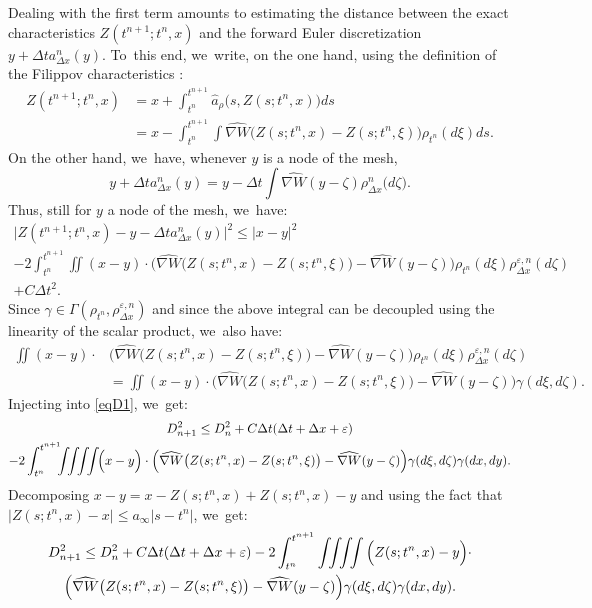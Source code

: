 \documentclass[JEP,XML,SOM,Unicode, NoFloatCountersInSection,published]{cedram}
\def\intquad {\int\mbox{\hspace{-2mm}}\int\mbox{\hspace{-2mm}}\int\mbox{\hspace{-2mm}}\int}
\def\eps{\varepsilon}
\def\dt{\Delta t}
\def\dx{\Delta x}
\def\achapo{\widehat{a}}
\def\nabWchapo{\widehat{\nabla W}}
\theoremstyle{plain}
\theoremstyle{definition}
\begin{document}
Dealing with the first term amounts to estimating the distance between the exact characteristics $Z(t^{n+1};t^n,x)$ and the forward Euler discretization $y+\dt a^n_{\dx}(y)$. To~this end, we~write, on the one hand, using the definition of the Filippov characteristics \cite{filippov88, poupaud_rascle97}:
\begin{align*}
Z(t^{n+1};t^n,x) & = x + \int_{t^n}^{t^{n+1}} \achapo_\rho\bigl(s,Z(s;t^n,x)\bigr) ds
\\
& = x - \int_{t^n}^{t^{n+1}} \int\nabWchapo\bigl(Z(s;t^n,x)-Z(s;t^n,\xi)\bigr) \rho_{t^n}(d\xi) ds.
\end{align*}
On the other hand, we~have, whenever $y$ is a node of the mesh,
\begin{equation*}
y + \dt a^n_{\dx}(y)
= y - \dt \int
\nabWchapo( y - \zeta) \rho^n_{\dx}( d \zeta \bigr).
\end{equation*}
Thus, still for $y$ a node of the mesh, we~have:
\begin{multline*}
\bigl|Z(t^{n+1};t^n,x)-y-\dt a^n_{\dx}(y)\bigr|^2 \leq |x-y|^2 \\
- 2\int_{t^n}^{t^{n+1}}\!\!\iint(x-y) \cdot \Big(\nabWchapo\big(Z(s;t^n,x)-Z(s;t^n,\xi)\big)-\nabWchapo(y-\zeta)\Big) \rho_{t^n}(d\xi) \rho_{\dx}^{\eps,n}(d\zeta) \\
+ C\dt^2.
\end{multline*}
Since $\gamma\in \Gamma(\rho_{t^n},\rho_{\dx}^{\eps,n})$ and since the above integral can be decoupled using the linearity of the scalar product, we~also have:
\begin{align*}
\iint(x-y) \cdot & \Big(\nabWchapo\big(Z(s;t^n,x)-Z(s;t^n,\xi)\big)-\nabWchapo(y-\zeta)\Big) \rho_{t^n}(d\xi) \rho_{\dx}^{\eps,n}(d\zeta) \\
& = \iint(x-y) \cdot \Big(\nabWchapo\big(Z(s;t^n,x)-Z(s;t^n,\xi)\big)-\nabWchapo(y-\zeta)\Big) \gamma(d\xi,d\zeta).
\end{align*}
Injecting into \eqref{eqD1}, we~get:
\begin{multline*}
D_{n+1}^2 \leq D_n^2 + C \dt(\dt+\dx+\eps) \\
- 2 \int_{t^n}^{t^{n+1}} \!\!\! \intquad \!\!\Big(x-y\Big) \cdot \Big(\nabWchapo\big(Z(s;t^n,x)-Z(s;t^n,\xi)\big)-\nabWchapo(y-\zeta)\Big) \gamma(d\xi,d\zeta) \gamma(dx,dy).
\end{multline*}
Decomposing $x-y=x-Z(s;t^n,x)+Z(s;t^n,x)-y$ and using the fact that \\
$|Z(s;t^n,x)-x|\leq a_\infty |s-t^n|$, we~get:
\begin{multline*}
D_{n+1}^2 \leq D_n^2 + C \dt(\dt+\dx+\eps)
- 2 \int_{t^n}^{t^{n+1}}\intquad \Big( Z(s;t^n,x)-y\Big) \cdot \\
\Big( \nabWchapo\bigl(Z(s;t^n,x) - Z(s;t^n,\xi)\bigr)-\nabWchapo(y-\zeta)\Big)
\gamma(d\xi,d\zeta) \gamma(dx,dy).
\end{multline*}
\end{document}
